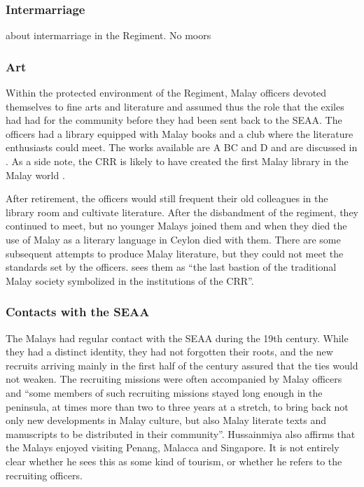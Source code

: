 \subsubsection{Intermarriage}\label{sec:slmbg:Intermarriage}
\citet[119]{Hussainmiya1990} about intermarriage in the Regiment. No moors

\subsubsection{Art}\label{sec:slmbg:Art}
Within the protected environment of the Regiment, Malay officers
devoted themselves to fine arts and literature and assumed thus
the role that the exiles had had for the community before they had
been sent back to the SEAA.  The officers had a library equipped
with Malay books \citep[145f]{Hussainmiya1990} and a club where
the literature enthusiasts could meet. The works available are A
BC  and D and are discussed in \citet{Hussainmiya1987}. As a side
note, the CRR is likely to have created the first Malay library in
the Malay world \citep[146]{Hussainmiya1990}.

After retirement, the officers would still frequent their old
colleagues in the library room and cultivate literature. After the
disbandment of the regiment, they continued to meet, \kuckn but no
younger Malays joined them and when they died the use of Malay as
a literary language in Ceylon died with them. There are some
subsequent attempts to produce Malay literature, but they could
not meet the standards set by the officers.
\citet[130]{Hussainmiya1990}  sees them as  ``the last bastion of
the traditional Malay society symbolized in the institutions of
the CRR''.


\subsubsection{Contacts with the SEAA}\label{sec:slmbg:ContactswiththeSEAA}
The Malays had regular contact with the SEAA during the 19th century. While they had a distinct identity, they had not forgotten their roots, and the new recruits arriving mainly in the first half of the century assured that the ties would not weaken. The recruiting missions were often accompanied by Malay officers and    ``some members of such recruiting missions stayed long enough in the peninsula, at times more than two to three years at a stretch, to bring back not only new developments in Malay culture, but also Malay literate texts and manuscripts to be distributed in their community''\citep[13]{Hussainmiya1987}. Hussainmiya also affirms that the Malays enjoyed visiting Penang, Malacca and Singapore. It is not entirely clear whether he sees this as some kind of tourism, or whether he refers to the recruiting officers\kuckn.

